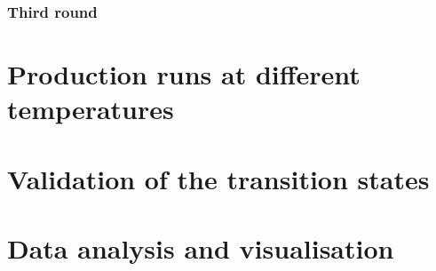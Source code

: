 \subsubsection{Third round}



\section{Production runs at different temperatures}



\section{Validation of the transition states}



\section{Data analysis and visualisation}